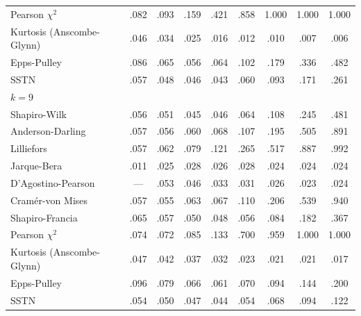 \documentclass[11pt]{article}
\begin{document}
\begin{table}[h]
\begin{tabular}{lcccccccc}
Pearson $\chi^2$ & .082 & .093 & .159 & .421 & .858 & 1.000 & 1.000 & 1.000 \\
Kurtosis (Anscombe-Glynn) & .046 & .034 & .025 & .016 & .012 & .010 & .007 & .006 \\
Epps-Pulley & .086 & .065 & .056 & .064 & .102 & .179 & .336 & .482 \\
SSTN & .057 & .048 & .046 & .043 & .060 & .093 & .171 & .261 \\
\midrule
\multicolumn{9}{l}{\textit{$k=9$}} \\
Shapiro-Wilk & .056 & .051 & .045 & .046 & .064 & .108 & .245 & .481 \\
Anderson-Darling & .057 & .056 & .060 & .068 & .107 & .195 & .505 & .891 \\
Lilliefors & .057 & .062 & .079 & .121 & .265 & .517 & .887 & .992 \\
Jarque-Bera & .011 & .025 & .028 & .026 & .028 & .024 & .024 & .024 \\
D'Agostino-Pearson & --- & .053 & .046 & .033 & .031 & .026 & .023 & .024 \\
Cram\'er-von Mises & .057 & .055 & .063 & .067 & .110 & .206 & .539 & .940 \\
Shapiro-Francia & .065 & .057 & .050 & .048 & .056 & .084 & .182 & .367 \\
Pearson $\chi^2$ & .074 & .072 & .085 & .133 & .700 & .959 & 1.000 & 1.000 \\
Kurtosis (Anscombe-Glynn) & .047 & .042 & .037 & .032 & .023 & .021 & .021 & .017 \\
Epps-Pulley & .096 & .079 & .066 & .061 & .070 & .094 & .144 & .200 \\
SSTN & .054 & .050 & .047 & .044 & .054 & .068 & .094 & .122 \\
\bottomrule
\end{tabular}
\par{}
\end{table}
\end{document}
